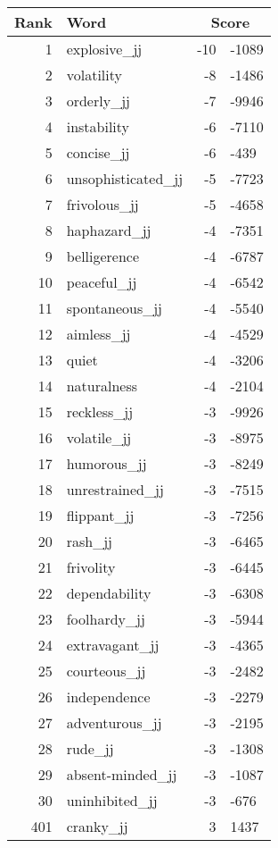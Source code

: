 \begin{longtable}[!htbp]{| rlr@{.}l |}
    \hline
    \textbf{Rank} & \textbf{Word} & \multicolumn{2}{c|}{\textbf{Score}} \\
    \hline
    \endhead
    1 & explosive\_jj & -10 & -1089 \\
    2 & volatility & -8 & -1486 \\
    3 & orderly\_jj & -7 & -9946 \\
    4 & instability & -6 & -7110 \\
    5 & concise\_jj & -6 & -439 \\
    6 & unsophisticated\_jj & -5 & -7723 \\
    7 & frivolous\_jj & -5 & -4658 \\
    8 & haphazard\_jj & -4 & -7351 \\
    9 & belligerence & -4 & -6787 \\
    10 & peaceful\_jj & -4 & -6542 \\
    11 & spontaneous\_jj & -4 & -5540 \\
    12 & aimless\_jj & -4 & -4529 \\
    13 & quiet & -4 & -3206 \\
    14 & naturalness & -4 & -2104 \\
    15 & reckless\_jj & -3 & -9926 \\
    16 & volatile\_jj & -3 & -8975 \\
    17 & humorous\_jj & -3 & -8249 \\
    18 & unrestrained\_jj & -3 & -7515 \\
    19 & flippant\_jj & -3 & -7256 \\
    20 & rash\_jj & -3 & -6465 \\
    21 & frivolity & -3 & -6445 \\
    22 & dependability & -3 & -6308 \\
    23 & foolhardy\_jj & -3 & -5944 \\
    24 & extravagant\_jj & -3 & -4365 \\
    25 & courteous\_jj & -3 & -2482 \\
    26 & independence & -3 & -2279 \\
    27 & adventurous\_jj & -3 & -2195 \\
    28 & rude\_jj & -3 & -1308 \\
    29 & absent-minded\_jj & -3 & -1087 \\
    30 & uninhibited\_jj & -3 & -676 \\
    401 & cranky\_jj & 3 & 1437 \\

\end{longtable}
